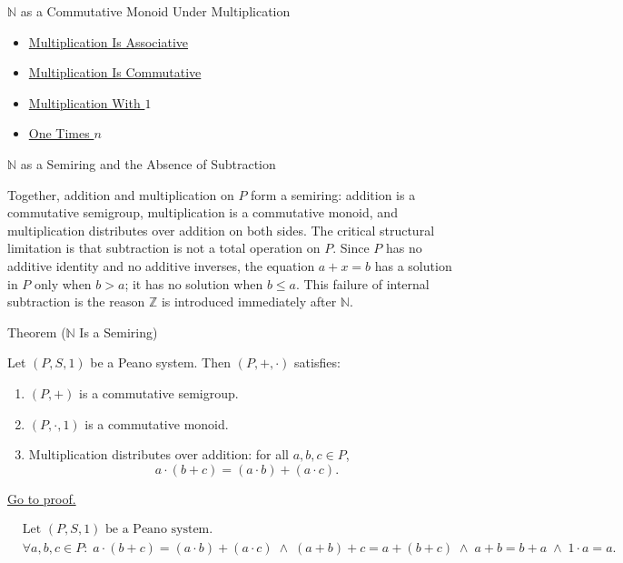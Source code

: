 \begin{topicbox}{$\mathbb{N}$ as a Commutative Monoid Under Multiplication}
\begin{dependencies}
\begin{itemize}
  \item \hyperref[thm:multiplication-associative]{Multiplication Is Associative}
  \item \hyperref[thm:multiplication-commutative]{Multiplication Is Commutative}
  \item \hyperref[thm:multiplication-with-one]{Multiplication With $1$}
  \item \hyperref[thm:one-times-n]{One Times $n$}
\end{itemize}
\end{dependencies}
\end{topicbox}

\begin{topicbox}{$\mathbb{N}$ as a Semiring and the Absence of Subtraction}
\begin{exposition}
Together, addition and multiplication on $P$ form a semiring: addition is a
commutative semigroup, multiplication is a commutative monoid, and
multiplication distributes over addition on both sides. The critical structural
limitation is that subtraction is not a total operation on $P$. Since $P$
has no additive identity and no additive inverses, the equation $a + x = b$
has a solution in $P$ only when $b > a$; it has no solution when $b \le a$.
This failure of internal subtraction is the reason $\mathbb{Z}$ is introduced
immediately after $\mathbb{N}$.
\end{exposition}

\begin{theorembox}{Theorem ($\mathbb{N}$ Is a Semiring)}
\begin{theorem}
\label{thm:n-is-semiring}
Let $(P,S,1)$ be a Peano system. Then $(P,+,\cdot)$ satisfies:
\begin{enumerate}
  \item $(P,+)$ is a commutative semigroup.
  \item $(P,\cdot,1)$ is a commutative monoid.
  \item Multiplication distributes over addition: for all $a,b,c \in P$,
  \[
  a \cdot (b+c) = (a \cdot b) + (a \cdot c).
  \]
\end{enumerate}
\hyperref[prf:n-is-semiring]{Go to proof.}
\end{theorem}
\end{theorembox}

\begin{remark*}
\[
\begin{aligned}
&\text{Let } (P,S,1) \text{ be a Peano system.}\\
&\forall a,b,c \in P:\;
a \cdot (b+c) = (a \cdot b) + (a \cdot c)
\;\land\;
(a+b)+c = a+(b+c)
\;\land\;
a+b = b+a
\;\land\;
1 \cdot a = a.
\end{aligned}
\]
\end{remark*}


\end{topicbox}
